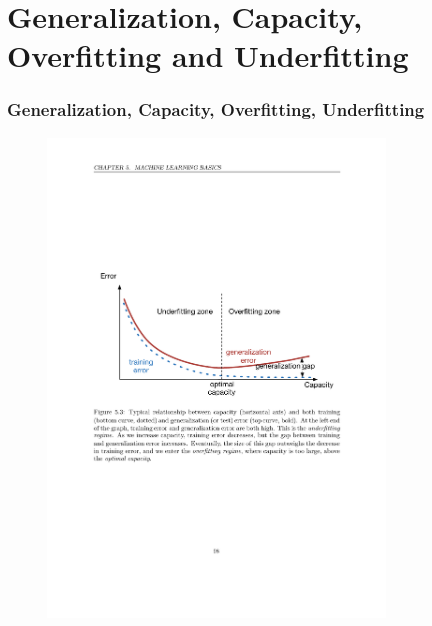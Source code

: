 \documentclass{beamer}
\begin{document}
\section{Generalization, Capacity, Overfitting and Underfitting}

%

\begin{frame}
  \frametitle{Generalization, Capacity, Overfitting, Underfitting}

  \begin{figure}
    \centering
    \includegraphics[width=0.8\textwidth]{relationships_between_terms.pdf}
  \end{figure}
\end{frame}
\end{document}

